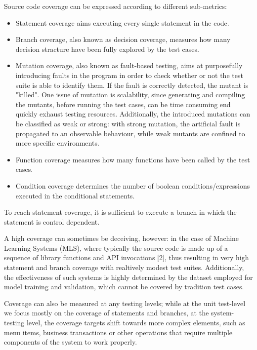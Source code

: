 Source code coverage can be expressed according to different sub-metrics:
\begin {itemize}
    \item Statement coverage aims executing every single statement in the code.
    \item Branch coverage, also known as decision coverage, measures how many decision stracture have been fully explored by the test cases.
    \item Mutation coverage, also known as fault-based testing, aims at purposefully introducing faults in the program in order to 
            check whether or not the test suite is able to identify them. If the fault is correctly detected, the mutant is "killed".
            One issue of mutation is scalability, since generating and compiling the mutants, before running the test cases, can be time
            consuming end quickly exhaust testing resources. Additionally, the introduced mutations can be classified as weak or strong:
            with strong mutation, the artificial fault is propagated to an observable behaviour, while weak mutants are confined to more 
            specific environments.
    \item Function coverage measures how many functions have been called by the test cases.
    \item Condition coverage determines the number of boolean conditions/expressions executed in the conditional statements.
\end {itemize}
To reach statement coverage, it is sufficient to execute a branch in which the statement is control dependent.

A high coverage can sometimes be deceiving, however: in the case of Machine Learning Systems (MLS), where typically the source code is made up 
of a sequence of library functions and API invocations [2], thus resulting in very high statement and branch coverage with realtively modest
test suites.
Additionally, the effectiveness of such systems is highly determined by the dataset employed for model training and validation, which
cannot be covered by tradition test cases.

Coverage can also be measured at any testing levels; while at the unit test-level we focus mostly on the coverage of statements and branches,
at the system-testing level, the coverage targets shift towards more complex elements, such as menu items, business transactions or other
operations that require multiple components of the system to work properly.

